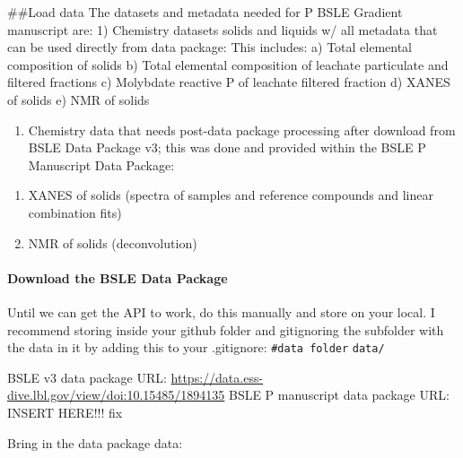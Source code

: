 \documentclass[
]{article}
\providecommand{\tightlist}{%
  \setlength{\itemsep}{0pt}\setlength{\parskip}{0pt}}
\begin{document}
\#\#Load data The datasets and metadata needed for P BSLE Gradient
manuscript are: 1) Chemistry datasets solids and liquids w/ all metadata
that can be used directly from data package: This includes: a) Total
elemental composition of solids b) Total elemental composition of
leachate particulate and filtered fractions c) Molybdate reactive P of
leachate filtered fraction d) XANES of solids e) NMR of solids

\begin{enumerate}
\def\labelenumi{\arabic{enumi})}
\setcounter{enumi}{1}
\tightlist
\item
  Chemistry data that needs post-data package processing after download
  from BSLE Data Package v3; this was done and provided within the BSLE
  P Manuscript Data Package:
\end{enumerate}

\begin{enumerate}
\def\labelenumi{\alph{enumi})}
\tightlist
\item
  XANES of solids (spectra of samples and reference compounds and linear
  combination fits)
\item
  NMR of solids (deconvolution)
\end{enumerate}

\hypertarget{download-the-bsle-data-package}{%
\paragraph{Download the BSLE Data
Package}\label{download-the-bsle-data-package}}

Until we can get the API to work, do this manually and store on your
local. I recommend storing inside your github folder and gitignoring the
subfolder with the data in it by adding this to your .gitignore:
\texttt{\#data\ folder} \texttt{data/}

BSLE v3 data package URL:
\url{https://data.ess-dive.lbl.gov/view/doi:10.15485/1894135} BSLE P
manuscript data package URL: INSERT HERE!!! fix

Bring in the data package data:
\end{document}

